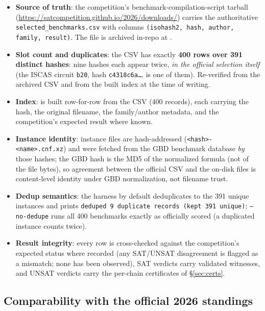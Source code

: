 \documentclass[10pt]{article}
\begin{document}
\begin{itemize}
\item \textbf{Source of truth}: the competition's
  benchmark-compilation-script tarball
  (\url{https://satcompetition.github.io/2026/downloads/}) carries the
  authoritative \texttt{selected\_benchmarks.csv} with columns
  \texttt{(isohash2, hash, author, family, result)}. The file is
  archived in-repo at
  .
\item \textbf{Slot count and duplicates}: the CSV has exactly
  \textbf{400 rows over 391 distinct hashes}: nine hashes each appear
  twice, \emph{in the official selection itself} (the ISCAS circuit
  \texttt{b20}, hash \texttt{c4318c6a\ldots}, is one of them).
  Re-verified from the archived CSV and from the built index at the
  time of writing.
\item \textbf{Index}:  is built
  row-for-row from the CSV (400 records), each carrying the hash, the
  original filename, the family/author metadata, and the
  competition's expected result where known.
\item \textbf{Instance identity}: instance files are hash-addressed
  (\texttt{<hash>-<name>.cnf.xz}) and were fetched from the GBD
  benchmark database \emph{by} those hashes; the GBD hash is the MD5
  of the normalized formula (not of the file bytes), so agreement
  between the official CSV and the on-disk files is content-level
  identity under GBD normalization, not filename trust.
\item \textbf{Dedup semantics}: the harness by default deduplicates to
  the 391 unique instances and prints
  \texttt{deduped 9 duplicate records (kept 391 unique)};
  \texttt{--no-dedupe} runs all 400 benchmarks exactly as officially
  scored (a duplicated instance counts twice).
\item \textbf{Result integrity}: every row is cross-checked against
  the competition's expected status where recorded (any
  SAT/UNSAT disagreement is flagged as a mismatch; none has been
  observed), SAT verdicts carry validated witnesses, and UNSAT
  verdicts carry the per-chain certificates of
  \S\ref{sec:certs}.
\end{itemize}

\subsection{Comparability with the official 2026 standings}
\label{sec:benchset-comparability}
\end{document}
